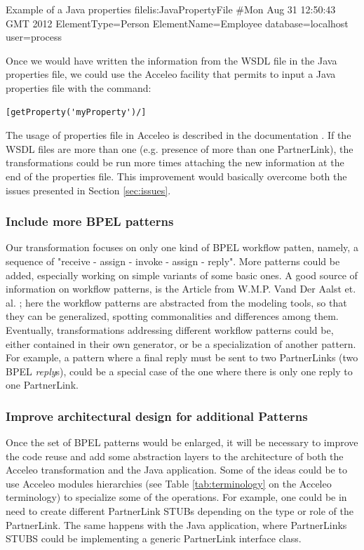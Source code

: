 \begin{center}
  \begin{minipage}{1\textwidth}
    \begin{java-code}{Example of a Java properties file}{lis:JavaPropertyFile}
#Mon Aug 31 12:50:43 GMT 2012
ElementType=Person
ElementName=Employee
database=localhost
user=process
    \end{java-code}
  \end{minipage}
\end{center}

Once we would have written the information from the WSDL file in the Java properties file, we could use the Acceleo facility that permits to input a Java properties file with the command:\\
\begin{verbatim}[getProperty('myProperty')/]\end{verbatim} 
The usage of properties file in Acceleo is described in the documentation \cite{acceleoDoc}. If the WSDL files are more than one (e.g. presence of more than one PartnerLink), the transformations could be run more times attaching the new information at the end of the properties file.
This improvement would basically overcome both the issues presented in Section \ref{sec:issues}.

\subsubsection{Include more BPEL patterns}
\label{sec:FutMorePatterns}
Our transformation focuses on only one kind of BPEL workflow patten, namely, a sequence of "receive - assign - invoke - assign - reply". More patterns could be added, especially working on simple variants of some basic ones. A good source of information on workflow patterns, is the Article from W.M.P. Vand Der Aalst et. al. \cite{AalstHKB03}; here the workflow patterns are abstracted from the modeling tools, so that they can be generalized, spotting commonalities and differences among them.
Eventually, transformations addressing different workflow patterns could be, either contained in their own generator, or be a specialization of another pattern. For example, a pattern where a final reply must be sent to two PartnerLinks (two BPEL \textit{reply}s), could be a special case of the one where there is only one reply to one PartnerLink.    

\subsubsection{Improve architectural design for additional Patterns}
\label{sec:FutImproveArchitectDesign}
Once the set of BPEL patterns would be enlarged, it will be necessary to improve the code reuse and add some abstraction layers to the architecture of both the Acceleo transformation and the Java application. Some of the ideas could be to use Acceleo modules hierarchies (see Table \ref{tab:terminology} on the Acceleo terminology) to specialize some of the operations. For example, one could be in need to create different PartnerLink STUBs depending on the type or role of the PartnerLink. The same happens with the Java application, where PartnerLinks STUBS could be implementing a generic PartnerLink interface class. 
